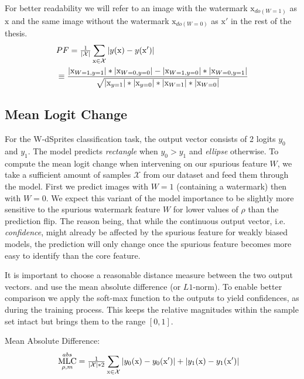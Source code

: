 For better readability we will refer to an image with the watermark $\mathrm{x}_{do(W=1)}$ as $\mathrm{x}$ and the same image without the watermark $\mathrm{x}_{do(W=0)}$ as $\mathrm{x'}$ in the rest of the thesis.
\begin{align}
\displaystyle 
& PF =\tfrac{1}{|\mathcal{X}|} \sum_{\mathrm{x} \in \mathcal{X}} |y(\mathrm{x}) - y(\mathrm{x'}) | \\
&  \equiv \frac{|\mathrm{x}_{W=1,y=1}|*|\mathrm{x}_{W=0,y=0}| - |\mathrm{x}_{W=1,y=0}|*|\mathrm{x}_{W=0,y=1}| }
{\sqrt{|\mathrm{x}_{y=1}|*|\mathrm{x}_{y=0}|*|\mathrm{x}_{W=1}|*|\mathrm{x}_{W=0}| }}
\end{align}

\subsection{Mean Logit Change}
For the W-dSprites classification task, the output vector consists of 2 logits $y_0$ and $y_1$. The model predicts \textit{rectangle} when $y_0 > y_1$ and \textit{ellipse} otherwise. To compute the mean logit change when intervening on our spurious feature $W$, we take a sufficient amount of samples $\mathcal{X}$ from our dataset and feed them through the model. First we predict images with $W=1$ (containing a watermark) then with $W=0$. 
We expect this variant of the model importance to be slightly more sensitive to the spurious watermark feature $W$ for lower values of $\rho$ than the prediction flip. The reason being, that while the continuous output vector, i.e. \textit{confidence}, might already be affected by the spurious feature for weakly biased models, the prediction will only change once the spurious feature becomes more easy to identify than the core feature. 

It is important to choose a reasonable distance measure between the two output vectors. \cite{Sixt2022a} and \cite{Goyal2019} use the mean absolute difference (or $L1$-norm). To enable better comparison we apply the soft-max function to the outputs to yield confidences, as during the training process. This keeps the relative magnitudes within the sample set intact but brings them to the range $[0,1]$. 

Mean Absolute Difference:
\begin{align}\displaystyle 
& \operatorname*{MLC}_{\rho, m}^{abs} = \tfrac{1}{|\mathcal{X}| * 2} \sum_{\mathrm{x} \in \mathcal{X}} 
|y_0(\mathrm{x}) -y_0(\mathrm{x'})| + |y_1(\mathrm{x}) -y_1(\mathrm{x'})| 
\end{align}


